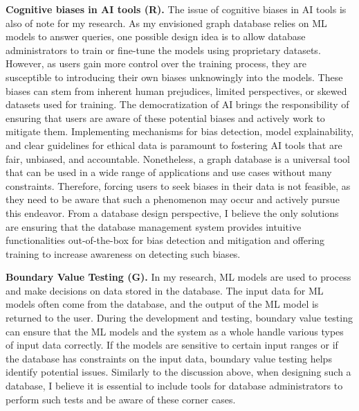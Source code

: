 \documentclass[a4paper, 11pt]{article}
\begin{document}
\noindent\textbf{Cognitive biases in AI tools (R).}
The issue of cognitive biases in AI tools is also of note for my research. As my envisioned graph database relies on ML models to answer queries, one possible design idea is to allow database administrators to train or fine-tune the models using proprietary datasets. However, as users gain more control over the training process, they are susceptible to introducing their own biases unknowingly into the models. These biases can stem from inherent human prejudices, limited perspectives, or skewed datasets used for training. The democratization of AI brings the responsibility of ensuring that users are aware of these potential biases and actively work to mitigate them. Implementing mechanisms for bias detection, model explainability, and clear guidelines for ethical data is paramount to fostering AI tools that are fair, unbiased, and accountable. Nonetheless, a graph database is a universal tool that can be used in a wide range of applications and use cases without many constraints. Therefore, forcing users to seek biases in their data is not feasible, as they need to be aware that such a phenomenon may occur and actively pursue this endeavor. From a database design perspective, I believe the only solutions are ensuring that the database management system provides intuitive functionalities out-of-the-box for bias detection and mitigation and offering training to increase awareness on detecting such biases.

\noindent\textbf{Boundary Value Testing (G).}
In my research, ML models are used to process and make decisions on data stored in the database. The input data for ML models often come from the database, and the output of the ML model is returned to the user. During the development and testing, boundary value testing can ensure that the ML models and the system as a whole handle various types of input data correctly. If the models are sensitive to certain input ranges or if the database has constraints on the input data, boundary value testing helps identify potential issues. Similarly to the discussion above, when designing such a database, I believe it is essential to include tools for database administrators to perform such tests and be aware of these corner cases.
\end{document}
